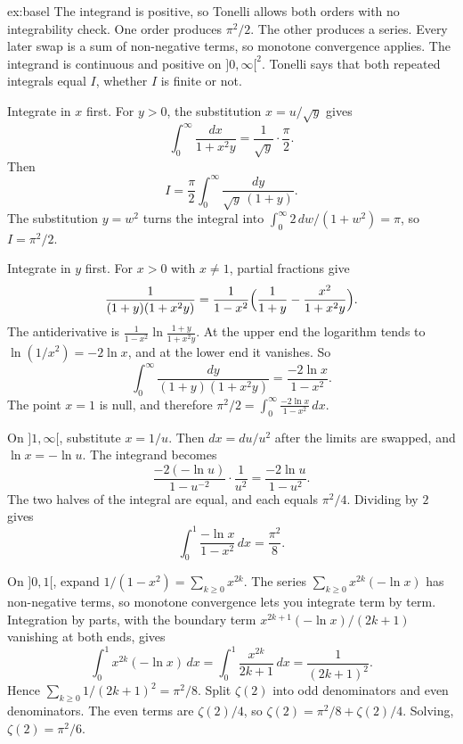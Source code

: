 \begin{solution}{ex:basel}
\idea The integrand is positive, so Tonelli allows both orders with no integrability check. One order produces $\pi^2/2$. The other produces a series. Every later swap is a sum of non-negative terms, so monotone convergence applies.
\writeup The integrand is continuous and positive on $]0,\infty[^2$. Tonelli says that both repeated integrals equal $I$, whether $I$ is finite or not.

Integrate in $x$ first. For $y>0$, the substitution $x=u/\sqrt y$ gives
\[
\int_0^\infty\frac{dx}{1+x^2 y}=\frac1{\sqrt y}\cdot\frac\pi2.
\]
Then
\[
I=\frac\pi2\int_0^\infty\frac{dy}{\sqrt y\,(1+y)}.
\]
The substitution $y=w^2$ turns the integral into $\int_0^\infty 2\,dw/(1+w^2)=\pi$, so $I=\pi^2/2$.

Integrate in $y$ first. For $x>0$ with $x\ne 1$, partial fractions give
\[
\frac1{(1+y)(1+x^2 y)}=\frac1{1-x^2}\Bigl(\frac1{1+y}-\frac{x^2}{1+x^2 y}\Bigr).
\]
The antiderivative is $\frac1{1-x^2}\ln\frac{1+y}{1+x^2 y}$. At the upper end the logarithm tends to $\ln(1/x^2)=-2\ln x$, and at the lower end it vanishes. So
\[
\int_0^\infty\frac{dy}{(1+y)(1+x^2 y)}=\frac{-2\ln x}{1-x^2}.
\]
The point $x=1$ is null, and therefore $\pi^2/2=\int_0^\infty\frac{-2\ln x}{1-x^2}\,dx$.

On $]1,\infty[$, substitute $x=1/u$. Then $dx=du/u^2$ after the limits are swapped, and $\ln x=-\ln u$. The integrand becomes
\[
\frac{-2(-\ln u)}{1-u^{-2}}\cdot\frac1{u^2}=\frac{-2\ln u}{1-u^2}.
\]
The two halves of the integral are equal, and each equals $\pi^2/4$. Dividing by $2$ gives
\[
\int_0^1\frac{-\ln x}{1-x^2}\,dx=\frac{\pi^2}8.
\]

On $]0,1[$, expand $1/(1-x^2)=\sum_{k\ge 0}x^{2k}$. The series $\sum_{k\ge 0}x^{2k}(-\ln x)$ has non-negative terms, so monotone convergence lets you integrate term by term. Integration by parts, with the boundary term $x^{2k+1}(-\ln x)/(2k+1)$ vanishing at both ends, gives
\[
\int_0^1 x^{2k}(-\ln x)\,dx=\int_0^1\frac{x^{2k}}{2k+1}\,dx=\frac1{(2k+1)^2}.
\]
Hence $\sum_{k\ge 0}1/(2k+1)^2=\pi^2/8$. Split $\zeta(2)$ into odd denominators and even denominators. The even terms are $\zeta(2)/4$, so $\zeta(2)=\pi^2/8+\zeta(2)/4$. Solving, $\zeta(2)=\pi^2/6$.
\end{solution}

